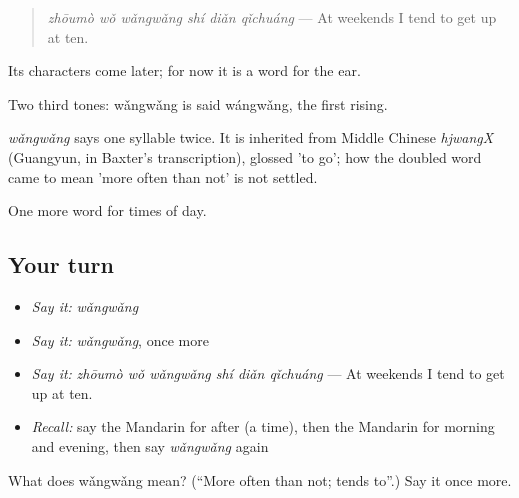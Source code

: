 \begin{quote}
\emph{zhōumò wǒ wǎngwǎng shí diǎn qǐchuáng} — At weekends I tend to get up at ten.
\end{quote}

Its characters come later; for now it is a word for the ear.

Two third tones: wǎngwǎng is said wángwǎng, the first rising.

\begin{cousinweb}
\emph{wǎngwǎng} says one syllable twice. It is inherited from Middle Chinese \emph{hjwangX} (Guangyun, in Baxter's transcription), glossed 'to go'; how the doubled word came to mean 'more often than not' is not settled.
\end{cousinweb}

\begin{grammarlens}[title={What you've built}]
One more word for times of day.
\end{grammarlens}

\subsection*{Your turn}
\begin{itemize}
\raggedright
  \item \emph{Say it:} \emph{wǎngwǎng}
  \item \emph{Say it:} \emph{wǎngwǎng}, once more
  \item \emph{Say it:} \emph{zhōumò wǒ wǎngwǎng shí diǎn qǐchuáng} — At weekends I tend to get up at ten.
  \item \emph{Recall:} say the Mandarin for after (a time), then the Mandarin for morning and evening, then say \emph{wǎngwǎng} again
\end{itemize}

\begin{tcolorbox}[breakable,colback=teal!4,colframe=teal!35!black,title={Before you move on}]
What does wǎngwǎng mean? (\textquotedblleft{}More often than not; tends to\textquotedblright{}.) Say it once more.
\end{tcolorbox}

